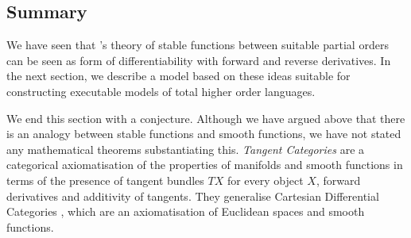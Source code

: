 




\subsection{Summary}
\label{sec:diff-stab-summary}

We have seen that \citet{berry79}'s theory of stable functions between suitable partial orders can be seen as form of differentiability with forward and reverse derivatives. In the next section, we describe a model based on these ideas suitable for constructing executable models of total higher order languages.

We end this section with a conjecture. Although we have argued above
that there is an analogy between stable functions and smooth
functions, we have not stated any mathematical theorems substantiating
this. \emph{Tangent Categories} \cite{tangent-categories} are a
categorical axiomatisation of the properties of manifolds and smooth
functions in terms of the presence of tangent bundles $TX$ for every
object $X$, forward derivatives and additivity of tangents. They
generalise Cartesian Differential Categories \cite{cdcs}, which are an
axiomatisation of Euclidean spaces and smooth functions.

